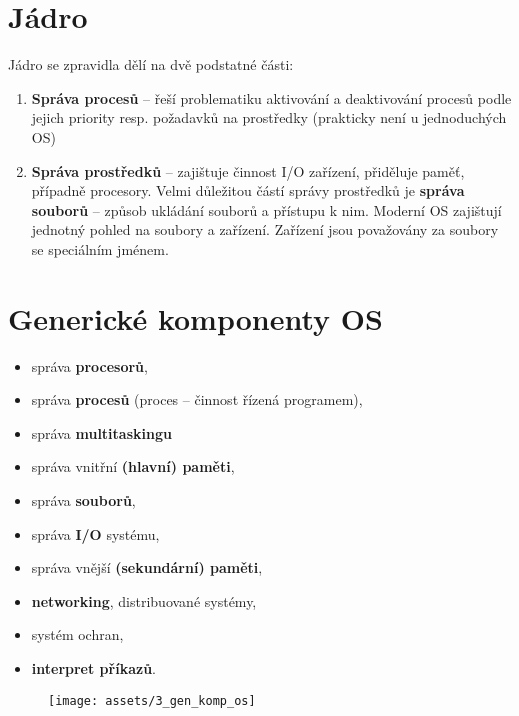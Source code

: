 \section{Jádro}
Jádro se zpravidla dělí na dvě podstatné části:
\begin{enumerate}
    \item \textbf{Správa procesů} -- řeší problematiku aktivování a deaktivování procesů podle jejich priority resp. požadavků na prostředky (prakticky není u jednoduchých OS)
    \item \textbf{Správa prostředků} -- zajištuje činnost I/O zařízení, přiděluje paměť, případně procesory. Velmi důležitou částí správy prostředků je \textbf{správa souborů} -- způsob ukládání souborů a přístupu k nim. Moderní OS zajištují jednotný pohled na soubory a zařízení. Zařízení jsou považovány za soubory se speciálním jménem.
\end{enumerate}

\section{Generické komponenty OS} %
\begin{minipage}[t]{0.6\textwidth}
    \begin{itemize}
        \item správa \textbf{procesorů},
        \item správa \textbf{procesů} (proces – činnost řízená programem),
        \item správa \textbf{multitaskingu}
        \item správa vnitřní \textbf{(hlavní) paměti},
        \item správa \textbf{souborů},
        \item správa \textbf{I/O} systému,
        \item správa vnější \textbf{(sekundární) paměti},
        \item \textbf{networking}, distribuované systémy,
        \item systém ochran,
        \item \textbf{interpret příkazů}.
    \end{itemize}
\end{minipage}
\begin{minipage}[t]{0.38\textwidth}
    \vspace{-10mm}
    \begin{figure}[H]
        \centering
        \texttt{[image: assets/3\_gen\_komp\_os]}
    \end{figure}
\end{minipage}

